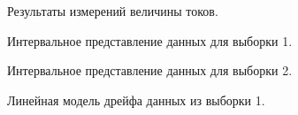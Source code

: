 \begin{figure}[H]
	\caption{Результаты измерений величины токов.}
	\label{ris:image2}
\end{figure}

\begin{figure}[H]
	\caption{Интервальное представление данных для выборки 1.}
	\label{ris:image2}
\end{figure}

\begin{figure}[H]
	\caption{Интервальное представление данных для выборки 2.}
	\label{ris:image2}
\end{figure}

\begin{figure}[H]
	\caption{Линейная модель дрейфа данных из выборки 1.}
	\label{ris:image1}
\end{figure}

